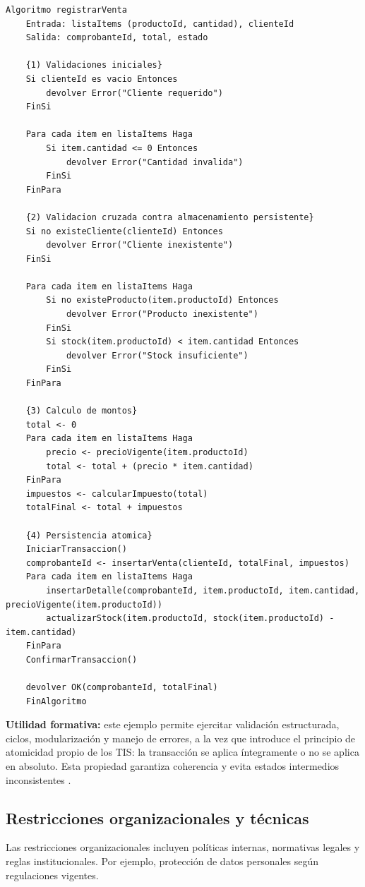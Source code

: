 \documentclass[12pt,twoside]{book}
\begin{document}
					\begin{lstlisting}[style=upsamStyle,caption={Pseudocódigo: Proceso transaccional \texttt{registrarVenta}},label={lst:registrarVenta},basicstyle=\small\ttfamily]
	Algoritmo registrarVenta
	Entrada: listaItems (productoId, cantidad), clienteId
	Salida: comprobanteId, total, estado
	
	{1) Validaciones iniciales}
	Si clienteId es vacio Entonces
		devolver Error("Cliente requerido")
	FinSi
	
	Para cada item en listaItems Haga
		Si item.cantidad <= 0 Entonces
			devolver Error("Cantidad invalida")
		FinSi
	FinPara
	
	{2) Validacion cruzada contra almacenamiento persistente}
	Si no existeCliente(clienteId) Entonces
		devolver Error("Cliente inexistente")
	FinSi
	
	Para cada item en listaItems Haga
		Si no existeProducto(item.productoId) Entonces
			devolver Error("Producto inexistente")
		FinSi
		Si stock(item.productoId) < item.cantidad Entonces
			devolver Error("Stock insuficiente")
		FinSi
	FinPara
	
	{3) Calculo de montos}
	total <- 0
	Para cada item en listaItems Haga
		precio <- precioVigente(item.productoId)
		total <- total + (precio * item.cantidad)
	FinPara
	impuestos <- calcularImpuesto(total)
	totalFinal <- total + impuestos
	
	{4) Persistencia atomica}
	IniciarTransaccion()
	comprobanteId <- insertarVenta(clienteId, totalFinal, impuestos)
	Para cada item en listaItems Haga
		insertarDetalle(comprobanteId, item.productoId, item.cantidad, precioVigente(item.productoId))
		actualizarStock(item.productoId, stock(item.productoId) - item.cantidad)
	FinPara
	ConfirmarTransaccion()
	
	devolver OK(comprobanteId, totalFinal)
	FinAlgoritmo \end{lstlisting}
						
					\noindent
					\textbf{Utilidad formativa:} este ejemplo permite ejercitar validación estructurada, ciclos, modularización y manejo de errores, a la vez que introduce el principio de atomicidad propio de los TIS: la transacción se aplica íntegramente o no se aplica en absoluto. Esta propiedad garantiza coherencia y evita estados intermedios inconsistentes \cite{Silberschatz2020Database,Date2019Database,ISO247722024Programming}.
					
					\subsection{Restricciones organizacionales y técnicas}
					\noindent
						Las restricciones organizacionales incluyen políticas internas, normativas legales y reglas institucionales. Por ejemplo, protección de datos personales según regulaciones vigentes.
						
\end{document}
